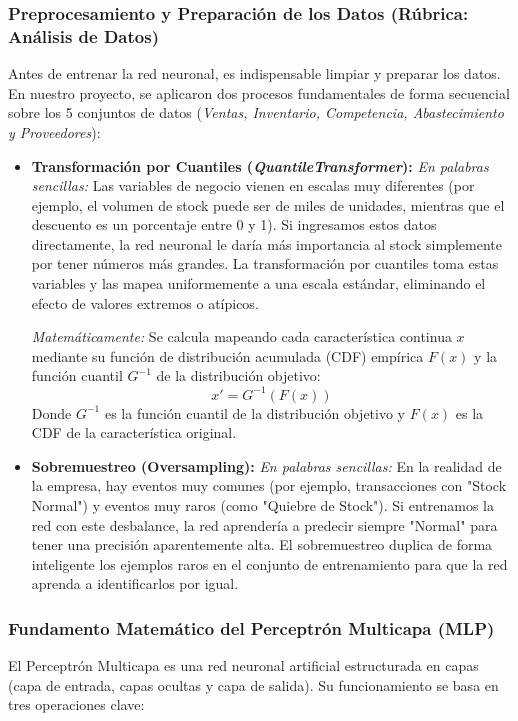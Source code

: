 \documentclass{article}
\begin{document}
\subsubsection{Preprocesamiento y Preparación de los Datos (Rúbrica: Análisis de Datos)}
Antes de entrenar la red neuronal, es indispensable limpiar y preparar los datos. En nuestro proyecto, se aplicaron dos procesos fundamentales de forma secuencial sobre los 5 conjuntos de datos (\textit{Ventas, Inventario, Competencia, Abastecimiento y Proveedores}):
\begin{itemize}
    \item \textbf{Transformación por Cuantiles (\textit{QuantileTransformer}):} 
    \textit{En palabras sencillas:} Las variables de negocio vienen en escalas muy diferentes (por ejemplo, el volumen de stock puede ser de miles de unidades, mientras que el descuento es un porcentaje entre 0 y 1). Si ingresamos estos datos directamente, la red neuronal le daría más importancia al stock simplemente por tener números más grandes. La transformación por cuantiles toma estas variables y las mapea uniformemente a una escala estándar, eliminando el efecto de valores extremos o atípicos.
    
    \textit{Matemáticamente:} Se calcula mapeando cada característica continua $x$ mediante su función de distribución acumulada (CDF) empírica $F(x)$ y la función cuantil $G^{-1}$ de la distribución objetivo:
    \begin{equation}
        x' = G^{-1}(F(x))
    \end{equation}
    Donde $G^{-1}$ es la función cuantil de la distribución objetivo y $F(x)$ es la CDF de la característica original.

    \item \textbf{Sobremuestreo (Oversampling):}
    \textit{En palabras sencillas:} En la realidad de la empresa, hay eventos muy comunes (por ejemplo, transacciones con "Stock Normal") y eventos muy raros (como "Quiebre de Stock"). Si entrenamos la red con este desbalance, la red aprendería a predecir siempre "Normal" para tener una precisión aparentemente alta. El sobremuestreo duplica de forma inteligente los ejemplos raros en el conjunto de entrenamiento para que la red aprenda a identificarlos por igual.
\end{itemize}

\subsubsection{Fundamento Matemático del Perceptrón Multicapa (MLP)}
El Perceptrón Multicapa es una red neuronal artificial estructurada en capas (capa de entrada, capas ocultas y capa de salida). Su funcionamiento se basa en tres operaciones clave:
\end{document}
